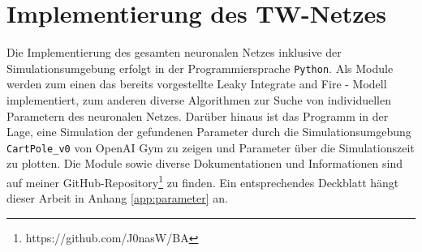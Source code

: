 %
\chapter{Implementierung des TW-Netzes}
\label{chap:imp}
%

	Die Implementierung des gesamten neuronalen Netzes inklusive der Simulationsumgebung erfolgt in der Programmiersprache \texttt{Python}. Als Module werden zum einen das bereits vorgestellte Leaky Integrate and Fire - Modell implementiert, zum anderen diverse Algorithmen zur Suche von individuellen Parametern des neuronalen Netzes. Darüber hinaus ist das Programm in der Lage, eine Simulation der gefundenen Parameter durch die Simulationsumgebung \texttt{CartPole\_v0} von OpenAI Gym zu zeigen und Parameter über die Simulationszeit zu plotten. Die Module sowie diverse Dokumentationen und Informationen sind auf meiner GitHub-Repository\footnote{https://github.com/J0nasW/BA} zu finden. Ein entsprechendes Deckblatt hängt dieser Arbeit in Anhang \ref{app:parameter} an.\\
		

